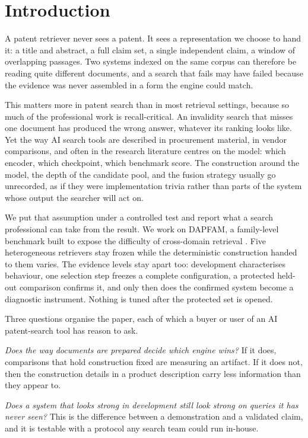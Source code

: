 \documentclass[preprint,11pt,authoryear]{elsarticle}          %
\begin{document}
\section{Introduction}
\label{sec:intro}

A patent retriever never sees a patent. It sees a representation we choose to hand it: a title and abstract, a full claim set, a single independent claim, a window of overlapping passages. Two systems indexed on the same corpus can therefore be reading quite different documents, and a search that fails may have failed because the evidence was never assembled in a form the engine could match.

This matters more in patent search than in most retrieval settings, because so much of the professional work is recall-critical. An invalidity search that misses one document has produced the wrong answer, whatever its ranking looks like. Yet the way AI search tools are described in procurement material, in vendor comparisons, and often in the research literature centres on the model: which encoder, which checkpoint, which benchmark score. The construction around the model, the depth of the candidate pool, and the fusion strategy usually go unrecorded, as if they were implementation trivia rather than parts of the system whose output the searcher will act on.

We put that assumption under a controlled test and report what a search professional can take from the result. We work on DAPFAM, a family-level benchmark built to expose the difficulty of cross-domain retrieval \citep{ayaou2026dapfam}. Five heterogeneous retrievers stay frozen while the deterministic construction handed to them varies. The evidence levels stay apart too: development characterises behaviour, one selection step freezes a complete configuration, a protected held-out comparison confirms it, and only then does the confirmed system become a diagnostic instrument. Nothing is tuned after the protected set is opened.

Three questions organise the paper, each of which a buyer or user of an AI patent-search tool has reason to ask.

\emph{Does the way documents are prepared decide which engine wins?} If it does, comparisons that hold construction fixed are measuring an artifact. If it does not, then the construction details in a product description carry less information than they appear to.

\emph{Does a system that looks strong in development still look strong on queries it has never seen?} This is the difference between a demonstration and a validated claim, and it is testable with a protocol any search team could run in-house.
\end{document}
